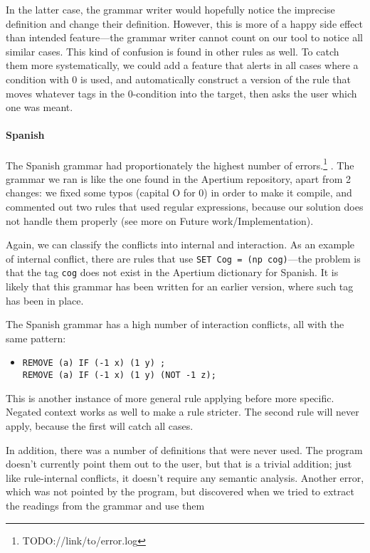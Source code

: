 In the latter case, the grammar writer would hopefully notice the imprecise definition and change their definition. However, this is more of a happy side effect than intended feature---the grammar writer cannot count on our tool to notice all similar cases.
This kind of confusion is found in other rules as well. 
To catch them more systematically, we could add a feature that alerts in all cases where a condition with 0 is used, and automatically construct a version of the rule that moves whatever tags in the 0-condition into the target, then asks the user which one was meant.

\paragraph{Spanish} The Spanish grammar had proportionately the highest number of errors.\footnote{TODO://link/to/error.log} .  The grammar we ran is like the one found in the Apertium repository, apart from 2 changes: we fixed some typos (capital O for 0) in order to make it compile, and commented out two rules that used regular expressions, because our solution does not handle them properly (see more on Future work/Implementation).

Again, we can classify the conflicts into internal and interaction. As an example of internal conflict, there are  rules that use \texttt{SET Cog = (np cog)}---the problem is that the tag \texttt{cog} does not exist in the Apertium dictionary for Spanish. It is likely that this grammar has been written for an earlier version, where such tag has been in place.




The Spanish grammar has a high number of interaction conflicts, all with the same pattern:

\begin{itemize}
\item[] 
\begin{verbatim}REMOVE (a) IF (-1 x) (1 y) ;
REMOVE (a) IF (-1 x) (1 y) (NOT -1 z);
\end{verbatim}
\end{itemize}


This is another instance of more general rule applying before more specific. Negated context works as well to make a rule stricter. The second rule will never apply, because the first will catch all cases.

In addition, there was a number of definitions that were never used. The program doesn't currently point them out to the user, but that is a trivial addition; just like rule-internal conflicts, it doesn't require any semantic analysis. 
Another error, which was not pointed by the program, but discovered when we tried to extract the readings from the grammar and use them 



